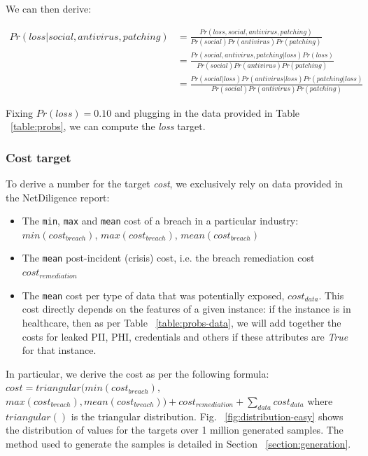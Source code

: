 We can then derive: 

\begin{equation} \label{eq1}
\begin{split}
Pr(loss | social, antivirus, patching) & = \frac{Pr(loss, social, antivirus, patching)}{Pr(social)Pr(antivirus)Pr(patching)} \\
 & = \frac{Pr(social, antivirus, patching | loss)Pr(loss)}{Pr(social)Pr(antivirus)Pr(patching)} \\
 & = \frac{Pr(social|loss)Pr(antivirus|loss)Pr(patching|loss)}{Pr(social)Pr(antivirus)Pr(patching)}
\end{split}
\end{equation}

Fixing $Pr(loss) = 0.10$ and plugging in the data provided in Table ~\ref{table:probs}, we can compute the \textit{loss} target.

\subsubsection{Cost target}

To derive a number for the target \textit{cost}, we exclusively rely on data provided in the NetDiligence \cite{netdiligence_report} report:

\begin{itemize}
	\item The \texttt{min}, \texttt{max} and \texttt{mean} cost of a breach in a particular industry: $min(cost_{breach})$, $max(cost_{breach})$, $mean(cost_{breach})$
	\item The \texttt{mean} post-incident (crisis) cost, i.e. the breach remediation cost $cost_{remediation}$
	\item The \texttt{mean} cost per type of data that was potentially exposed, $cost_{data}$. This cost directly depends on the features of a given instance: if the instance is in healthcare, then as per Table ~\ref{table:probs-data}, we will add together the costs for leaked PII, PHI, credentials and others if these attributes are \textit{True} for that instance.
\end{itemize}

In particular, we derive the cost as per the following formula: $cost = triangular(min(cost_{breach}),$ $max(cost_{breach}), mean(cost_{breach})) + cost_{remediation} + \sum_{data}{cost_{data}}$ where $triangular()$ is the triangular distribution. Fig. ~\ref{fig:distribution-easy} shows the distribution of values for the targets over 1 million generated samples. The method used to generate the samples is detailed in Section ~\ref{section:generation}.

